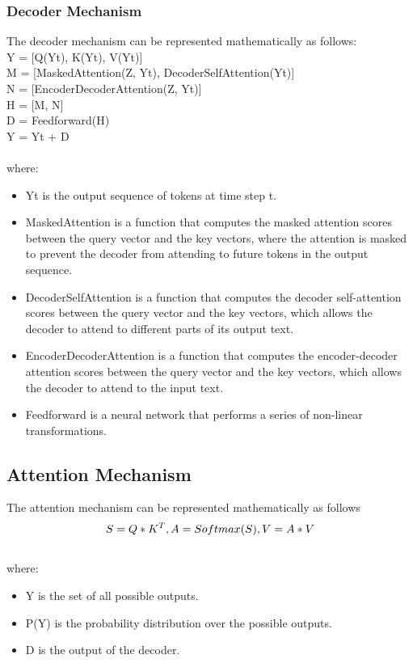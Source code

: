 \documentclass{article}
\begin{document}
\subsubsection{Decoder Mechanism}
The decoder mechanism can be represented mathematically as follows: \\
Y = [Q(Yt), K(Yt), V(Yt)] \\
M = [MaskedAttention(Z, Yt), DecoderSelfAttention(Yt)] \\
N = [EncoderDecoderAttention(Z, Yt)] \\
H = [M, N] \\
D = Feedforward(H) \\
Y = Yt + D \\ \\
where:
\begin{itemize}
    \item Yt is the output sequence of tokens at time step t.	
    \item MaskedAttention is a function that computes the masked attention scores between the query vector and the key vectors, where the attention is masked to prevent the decoder from attending to future tokens in the output sequence.
    \item DecoderSelfAttention is a function that computes the decoder self-attention scores between the query vector and the key vectors, which allows the decoder to attend to different parts of its output text.
    \item EncoderDecoderAttention is a function that computes the encoder-decoder attention scores between the query vector and the key vectors, which allows the decoder to attend to the input text.
    \item Feedforward is a neural network that performs a series of non-linear transformations.

\end{itemize}

\subsection{Attention Mechanism}
The attention mechanism can be represented mathematically as follows \\
\[S = Q * K^T ,  \\ 
A = Softmax(S) , \\
V = A * V \] \\ 
where:
\begin{itemize}
    \item Y is the set of all possible outputs.
    \item P(Y) is the probability distribution over the possible outputs.
    \item D is the output of the decoder.
\end{itemize}
\end{document}
